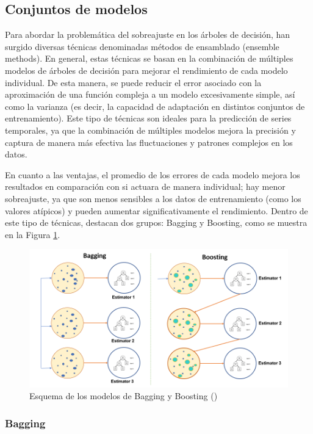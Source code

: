 \documentclass[12pt,a4paper]{report}
\begin{document}
\subsection{Conjuntos de modelos}

Para abordar la problemática del sobreajuste en los árboles de decisión, han surgido diversas técnicas denominadas métodos de ensamblado (ensemble methods). En general, estas técnicas se basan en la combinación de múltiples modelos de árboles de decisión para mejorar el rendimiento de cada modelo individual. De esta manera, se puede reducir el error asociado con la aproximación de una función compleja a un modelo excesivamente simple, así como la varianza (es decir, la capacidad de adaptación en distintos conjuntos de entrenamiento). Este tipo de técnicas son ideales para la predicción de series temporales, ya que la combinación de múltiples modelos mejora la precisión y captura de manera más efectiva las fluctuaciones y patrones complejos en los datos.

En cuanto a las ventajas, el promedio de los errores de cada modelo mejora los resultados en comparación con si actuara de manera individual; hay menor sobreajuste, ya que son menos sensibles a los datos de entrenamiento (como los valores atípicos) y pueden aumentar significativamente el rendimiento. Dentro de este tipo de técnicas, destacan dos grupos: Bagging y Boosting, como se muestra en la Figura \ref{fig:BB}.


\begin{figure}[H]
    \centering
    \includegraphics[width=1\textwidth]{Images/tfm-2.6.png}
    \caption{Esquema de los modelos de Bagging y Boosting (\cite{liu2013overview})}
    \label{fig:BB}
\end{figure}

\subsubsection{Bagging}
\end{document}
